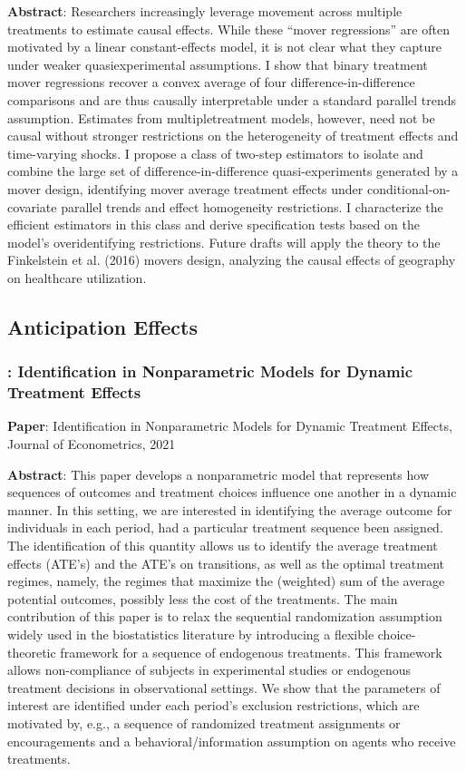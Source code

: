\documentclass[12pt]{article}
\theoremstyle{definition}
\begin{document}
{\bf Abstract}: Researchers increasingly leverage movement across multiple treatments to estimate causal effects. While these ``mover regressions'' are often motivated by a linear constant-effects model, it is not clear what they capture under weaker quasiexperimental assumptions. I show that binary treatment mover regressions recover a convex average of four difference-in-difference comparisons and are thus causally interpretable under a standard parallel trends assumption. Estimates from multipletreatment models, however, need not be causal without stronger restrictions on the heterogeneity of treatment effects and time-varying shocks. I propose a class of two-step estimators to isolate and combine the large set of difference-in-difference quasi-experiments generated by a mover design, identifying mover average treatment effects under conditional-on-covariate parallel trends and effect homogeneity restrictions. I characterize the efficient estimators in this class and derive specification tests based on the model's overidentifying restrictions. Future drafts will apply the theory to the Finkelstein et al. (2016) movers design, analyzing the causal effects of geography on healthcare utilization.

\subsection{Anticipation Effects}

\subsubsection{\citet{hanIdentificationNonparametricModels2021}: Identification in Nonparametric Models for Dynamic Treatment Effects}

{\bf Paper}: Identification in Nonparametric Models for Dynamic Treatment Effects, Journal of Econometrics, 2021

{\bf Abstract}: This paper develops a nonparametric model that represents how sequences of outcomes and treatment choices influence one another in a dynamic manner. In this setting, we are interested in identifying the average outcome for individuals in each period, had a particular treatment sequence been assigned. The identification of this quantity allows us to identify the average treatment effects (ATE's) and the ATE's on transitions, as well as the optimal treatment regimes, namely, the regimes that maximize the (weighted) sum of the average potential outcomes, possibly less the cost of the treatments. The main contribution of this paper is to relax the sequential randomization assumption widely used in the biostatistics literature by introducing a flexible choice-theoretic framework for a sequence of endogenous treatments. This framework allows non-compliance of subjects in experimental studies or endogenous treatment decisions in observational settings. We show that the parameters of interest are identified under each period's exclusion restrictions, which are motivated by, e.g., a sequence of randomized treatment assignments or encouragements and a behavioral/information assumption on agents who receive treatments.
\end{document}
